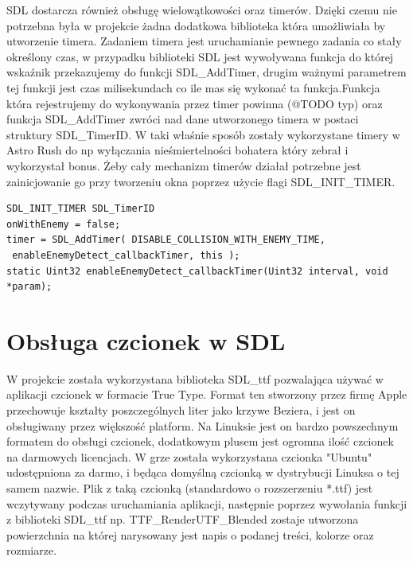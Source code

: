 SDL dostarcza również obsługę wielowątkowości oraz timerów. Dzięki czemu nie potrzebna była w projekcie żadna dodatkowa biblioteka która umożliwiała by utworzenie timera. Zadaniem timera jest uruchamianie pewnego zadania co stały określony czas, w przypadku biblioteki SDL jest wywoływana funkcja do której wskaźnik przekazujemy do funkcji  SDL\_AddTimer, drugim ważnymi parametrem tej funkcji jest czas milisekundach co ile mas się wykonać ta funkcja.Funkcja która rejestrujemy do wykonywania przez timer powinna (@TODO typ) oraz funkcja SDL\_AddTimer zwróci nad dane utworzonego timera w postaci struktury SDL\_TimerID. W taki właśnie sposób zostały wykorzystane timery w Astro Rush do np wyłączania nieśmiertelności bohatera który zebrał i wykorzystał bonus. Żeby cały mechanizm timerów działał potrzebne jest zainicjowanie go przy tworzeniu okna poprzez użycie flagi SDL\_INIT\_TIMER.
\begin{verbatim} 
SDL_INIT_TIMER SDL_TimerID
onWithEnemy = false;
timer = SDL_AddTimer( DISABLE_COLLISION_WITH_ENEMY_TIME,
 enableEnemyDetect_callbackTimer, this );
static Uint32 enableEnemyDetect_callbackTimer(Uint32 interval, void *param);
\end{verbatim}

\section{Obsługa czcionek w SDL}
W projekcie została wykorzystana biblioteka SDL\_ttf pozwalająca używać w aplikacji czcionek w formacie True Type. Format ten stworzony przez firmę Apple przechowuje kształty poszczególnych liter jako krzywe Beziera, i jest on obsługiwany przez większość platform. Na Linuksie jest on bardzo powszechnym formatem do obsługi czcionek, dodatkowym plusem jest ogromna ilość czcionek na darmowych licencjach. W grze została wykorzystana czcionka "Ubuntu" udostępniona za darmo, i będąca domyślną czcionką w dystrybucji Linuksa o tej samem nazwie. Plik z taką czcionką (standardowo o rozszerzeniu *.ttf) jest wczytywany podczas uruchamiania aplikacji, następnie poprzez wywołania funkcji z biblioteki SDL\_ttf np. TTF\_RenderUTF\_Blended zostaje utworzona powierzchnia na której narysowany jest napis o podanej treści, kolorze oraz rozmiarze. 

